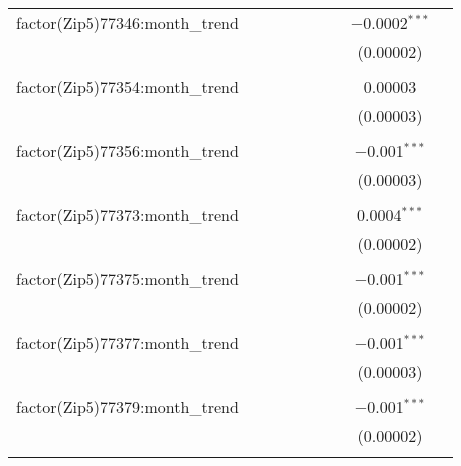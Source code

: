 \begin{table}[H]
{\begin{tabular}{@{\extracolsep{5pt}}lcccccccc}
  factor(Zip5)77346:month\_trend &  &  &  &  &  &  & $-$0.0002$^{***}$ &  \\  

   &  &  &  &  &  &  & (0.00002) &  \\  

   & & & & & & & & \\  

  factor(Zip5)77354:month\_trend &  &  &  &  &  &  & 0.00003 &  \\  

   &  &  &  &  &  &  & (0.00003) &  \\  

   & & & & & & & & \\  

  factor(Zip5)77356:month\_trend &  &  &  &  &  &  & $-$0.001$^{***}$ &  \\  

   &  &  &  &  &  &  & (0.00003) &  \\  

   & & & & & & & & \\  

  factor(Zip5)77373:month\_trend &  &  &  &  &  &  & 0.0004$^{***}$ &  \\  

   &  &  &  &  &  &  & (0.00002) &  \\  

   & & & & & & & & \\  

  factor(Zip5)77375:month\_trend &  &  &  &  &  &  & $-$0.001$^{***}$ &  \\  

   &  &  &  &  &  &  & (0.00002) &  \\  

   & & & & & & & & \\  

  factor(Zip5)77377:month\_trend &  &  &  &  &  &  & $-$0.001$^{***}$ &  \\  

   &  &  &  &  &  &  & (0.00003) &  \\  

   & & & & & & & & \\  

  factor(Zip5)77379:month\_trend &  &  &  &  &  &  & $-$0.001$^{***}$ &  \\  

   &  &  &  &  &  &  & (0.00002) &  \\  

   & & & & & & & & \\  


\end{tabular}}
\end{table}
